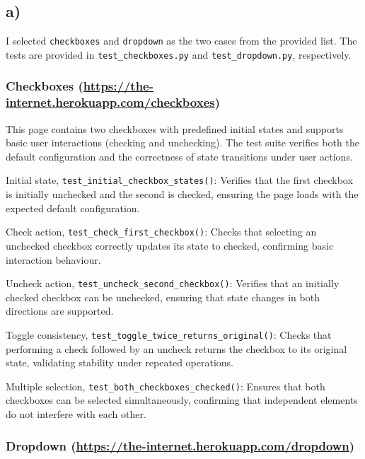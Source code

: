 \subsection*{a)}

I selected \texttt{checkboxes} and \texttt{dropdown} as the two cases from 
the provided list. The tests are provided in \texttt{test\_checkboxes.py} 
and \texttt{test\_dropdown.py}, respectively.

\medskip

\subsubsection*{Checkboxes (\url{https://the-internet.herokuapp.com/checkboxes})}

This page contains two checkboxes with predefined initial states and supports 
basic user interactions (checking and unchecking). The test suite verifies both 
the default configuration and the correctness of state transitions under user actions.

\medskip

Initial state, \texttt{test\_initial\_checkbox\_states()}: 
Verifies that the first checkbox is initially unchecked and the second is checked, 
ensuring the page loads with the expected default configuration.

\medskip

Check action, \texttt{test\_check\_first\_checkbox()}:
Checks that selecting an unchecked checkbox correctly updates its state to checked, 
confirming basic interaction behaviour.

\medskip

Uncheck action, \texttt{test\_uncheck\_second\_checkbox()}: 
Verifies that an initially checked checkbox can be unchecked, ensuring that state 
changes in both directions are supported.

\medskip

Toggle consistency, \texttt{test\_toggle\_twice\_returns\_original()}:
Checks that performing a check followed by an uncheck returns the checkbox to its 
original state, validating stability under repeated operations.

\medskip

Multiple selection, \texttt{test\_both\_checkboxes\_checked()}:  
Ensures that both checkboxes can be selected simultaneously, confirming that 
independent elements do not interfere with each other.

\medskip

\subsubsection*{Dropdown (\url{https://the-internet.herokuapp.com/dropdown})}

